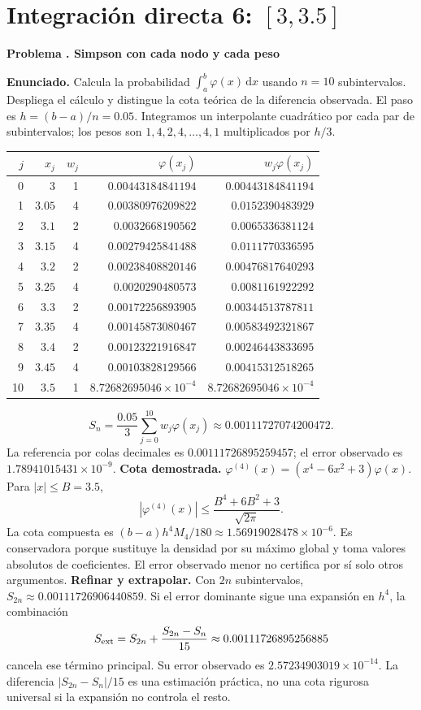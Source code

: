 \documentclass[11pt,a4paper]{article}
\newcommand{\dd}{\,\mathrm d}
\theoremstyle{definition}
\newcounter{problema}
\newenvironment{resuelto}[1]{\refstepcounter{problema}\par\medskip\Needspace{6\baselineskip}\textbf{Problema \theproblema. #1}\par}{\par\medskip}
\begin{document}
\section{\texorpdfstring{Integración directa 6: $[3,3.5]$}{Integración directa 6: [3,3.5]}}
\begin{resuelto}{Simpson con cada nodo y cada peso}
\textbf{Enunciado.} Calcula la probabilidad $\int_a^b\varphi(x)\dd x$ usando $n=10$ subintervalos. Despliega el cálculo y distingue la cota teórica de la diferencia observada.
El paso es $h=(b-a)/n=0.05$. Integramos un interpolante cuadrático por cada par de subintervalos; los pesos son $1,4,2,4,\ldots,4,1$ multiplicados por $h/3$.

\begin{center}\small\begin{tabular}{rrrrr}
\toprule
$j$&$x_j$&$w_j$&$\varphi(x_j)$&$w_j\varphi(x_j)$\\
\midrule
0&$3$&1&$0.00443184841194$&$0.00443184841194$\\
1&$3.05$&4&$0.00380976209822$&$0.0152390483929$\\
2&$3.1$&2&$0.0032668190562$&$0.0065336381124$\\
3&$3.15$&4&$0.00279425841488$&$0.0111770336595$\\
4&$3.2$&2&$0.00238408820146$&$0.00476817640293$\\
5&$3.25$&4&$0.0020290480573$&$0.0081161922292$\\
6&$3.3$&2&$0.00172256893905$&$0.00344513787811$\\
7&$3.35$&4&$0.00145873080467$&$0.00583492321867$\\
8&$3.4$&2&$0.00123221916847$&$0.00246443833695$\\
9&$3.45$&4&$0.00103828129566$&$0.00415312518265$\\
10&$3.5$&1&$8.72682695046\times10^{-4}$&$8.72682695046\times10^{-4}$\\
\bottomrule\end{tabular}\end{center}
\[
S_n=\frac{0.05}{3}\sum_{j=0}^{10}w_j\varphi(x_j)\approx0.00111727074200472.
\]
La referencia por colas decimales es $0.00111726895259457$; el error observado es $1.78941015431\times10^{-9}$.
\textbf{Cota demostrada.} $\varphi^{(4)}(x)=(x^4-6x^2+3)\varphi(x)$. Para $|x|\le B=3.5$,
\[
|\varphi^{(4)}(x)|\le\frac{B^4+6B^2+3}{\sqrt{2\pi}}.
\]
La cota compuesta es $(b-a)h^4M_4/180\approx1.56919028478\times10^{-6}$. Es conservadora porque sustituye la densidad por su máximo global y toma valores absolutos de coeficientes. El error observado menor no certifica por sí solo otros argumentos.
\textbf{Refinar y extrapolar.} Con $2n$ subintervalos, $S_{2n}\approx0.00111726906440859$. Si el error dominante sigue una expansión en $h^4$, la combinación
\[
S_{\rm ext}=S_{2n}+\frac{S_{2n}-S_n}{15}\approx0.00111726895256885
\]
cancela ese término principal. Su error observado es $2.57234903019\times10^{-14}$. La diferencia $|S_{2n}-S_n|/15$ es una estimación práctica, no una cota rigurosa universal si la expansión no controla el resto.
\end{resuelto}
\end{document}
